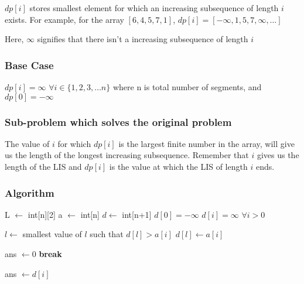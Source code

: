 \documentclass[12pt]{article}
\begin{document}
$dp[i]$ stores smallest element for which an increasing subsequence of length $i$ exists. For example, for the array ${[6, 4, 5, 7, 1]}$, 
$dp[i] = [-\infty, 1, 5, 7, \infty, \dots]$

Here, $\infty$ signifies that there isn't a increasing subsequence of length $i$

\subsubsection{Base Case}

$dp[i] = \infty $ $\forall i \in \{1, 2, 3, \dots n\}$ where n is total number of segments, and $dp[0] = -\infty$

\subsubsection{Sub-problem which solves the original problem}

The value of $i$ for which $dp[i]$ is the largest finite number in the array, will give us the length of the longest increasing subsequence. Remember that $i$ gives us the length of the LIS and $dp[i]$ is the value at which the LIS of length $i$ ends.


\subsubsection{Algorithm}

\begin{algorithm}
    \begin{algorithmic}[1]
        \Require L $\leftarrow$ int[n][2] 
        \Require a $\leftarrow$ int[n] 
        \State $d \leftarrow$ int[n+1]
        \State $d[0] = -\infty$
        \State $d[i] = \infty$ $\forall i > 0$

            \State $l \leftarrow$ smallest value of $l$ such that $d[l] > a[i]$
                \State $d[l] \leftarrow a[i]$
            \EndIf
            
        \EndFor

        \State ans $\leftarrow 0$
                \State \textbf{break}
            \EndIf

            \State ans $\leftarrow d[i]$
        \EndFor
    \end{algorithmic}
\end{algorithm}
\end{document}
